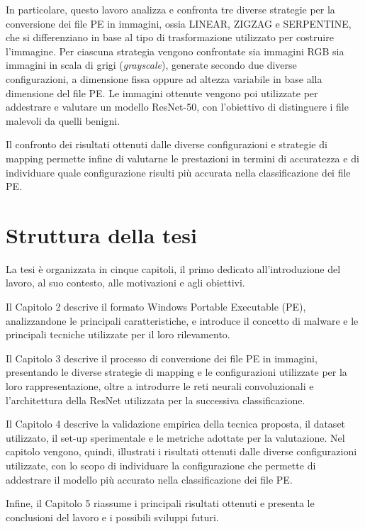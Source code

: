In particolare, questo lavoro analizza e confronta tre diverse strategie
per la conversione dei file PE in immagini, ossia LINEAR, ZIGZAG e
SERPENTINE, che si differenziano in base al tipo di trasformazione utilizzato
per costruire l'immagine. Per ciascuna strategia vengono confrontate
sia immagini RGB sia immagini in scala di grigi (\textit{grayscale}),
generate secondo due diverse configurazioni, a dimensione fissa oppure
ad altezza variabile in base alla dimensione del file PE. Le immagini
ottenute vengono poi utilizzate per addestrare e valutare un modello
ResNet-50, con l'obiettivo di distinguere i file malevoli da quelli
benigni.

Il confronto dei risultati ottenuti dalle diverse configurazioni e
strategie di mapping permette infine di valutarne le prestazioni
in termini di accuratezza e di
individuare quale configurazione risulti più accurata
nella classificazione dei file PE.

\section{Struttura della tesi}

La tesi è organizzata in cinque capitoli, il primo dedicato
all'introduzione del lavoro, al suo contesto, alle motivazioni e agli
obiettivi. 

Il Capitolo 2 descrive il formato Windows Portable Executable (PE),
analizzandone le principali caratteristiche, e introduce il concetto
di malware e le principali tecniche utilizzate per il loro rilevamento.

Il Capitolo 3 descrive il processo di conversione dei file PE in immagini,
presentando le diverse strategie di mapping e le configurazioni utilizzate
per la loro rappresentazione, oltre a introdurre le reti neurali convoluzionali
e l'architettura della ResNet utilizzata per la successiva classificazione.

Il Capitolo 4 descrive la validazione empirica
della tecnica proposta, il dataset utilizzato,
il set-up sperimentale e le metriche adottate per la valutazione.
Nel capitolo vengono, quindi, illustrati i risultati
ottenuti dalle diverse configurazioni utilizzate, con lo scopo di
individuare la configurazione che permette di addestrare
il modello più accurato nella classificazione dei file PE.

Infine, il Capitolo 5 riassume i principali risultati ottenuti e
presenta le conclusioni del lavoro e i possibili sviluppi futuri.